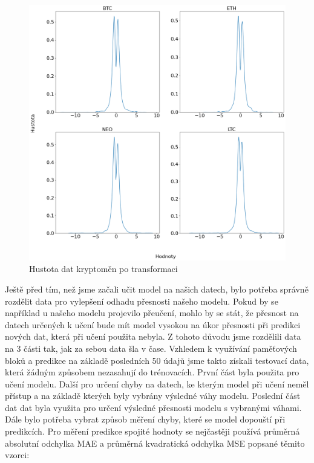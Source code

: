 \begin{figure}
    \caption{Hustota dat kryptoměn po transformaci}
    \label{transformation}
    \centering
    \includegraphics[width=\textwidth]{transformed.png}
\end{figure}

Ještě před tím, než jsme začali učit model na našich datech, bylo potřeba správně rozdělit data pro vylepšení odhadu přesnosti našeho modelu. 
Pokud by se například u našeho modelu projevilo přeučení, mohlo by se stát, že přesnost na datech určených k učení bude mít model vysokou na úkor přesnosti při predikci nových dat, která při učení použita nebyla. 
Z tohoto důvodu jsme rozdělili data na 3 části tak, jak za sebou data šla v čase.
Vzhledem k využívání paměťových bloků a predikce na základě posledních 50 údajů jsme takto získali testovací data, která žádným způsobem nezasahují do trénovacích. 
První část byla použita pro učení modelu.
Další pro určení chyby na datech, ke kterým model při učení neměl přístup a na základě kterých byly vybrány výsledné váhy modelu.
Poslední část dat dat byla využita pro určení výsledné přesnosti modelu s vybranými váhami. 
Dále bylo potřeba vybrat způsob měření chyby, které se model dopouští při predikcích. 
Pro měření predikce spojité hodnoty se nejčastěji používá průměrná absolutní odchylka MAE a průměrná kvadratická odchylka MSE popsané těmito vzorci:

